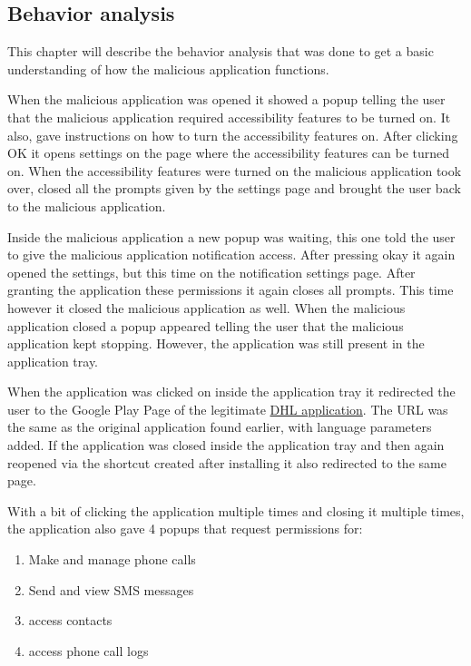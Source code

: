\subsection{Behavior analysis}

This chapter will describe the behavior analysis that was done to get a basic understanding of how the malicious application functions.

When the malicious application was opened it showed a popup telling the user that the malicious application required accessibility features to be turned on.
It also, gave instructions on how to turn the accessibility features on.
After clicking OK it opens settings on the page where the accessibility features can be turned on. 
When the accessibility features were turned on the malicious application took over, closed all the prompts given by the settings page and brought the user back to the malicious application.

Inside the malicious application a new popup was waiting, this one told the user to give the malicious application notification access. After pressing okay it again opened the settings, but this time on the notification settings page. After granting the application these permissions it again closes all prompts. 
This time however it closed the malicious application as well.
When the malicious application closed a popup appeared telling the user that the malicious application kept stopping.
However, the application was still present in the application tray.

When the application was clicked on inside the application tray it redirected the user to the Google Play Page of the legitimate \href{https://play.google.com/store/apps/details?id=com.dhl.exp.dhlmobile&hl=en&gl=US}{DHL application}.
The URL was the same as the original application found earlier, with language parameters added.
If the application was closed inside the application tray and then again reopened via the shortcut created after installing it also redirected to the same page.

With a bit of clicking the application multiple times and closing it multiple times, the application also gave 4 popups that request permissions for:
\begin{enumerate}
    \item Make and manage phone calls
    \item Send and view SMS messages
    \item access contacts
    \item access phone call logs
\end{enumerate}